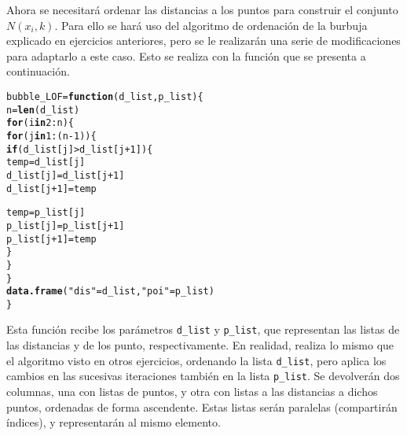 \documentclass[12pt]{report}\usepackage[]{graphicx}\usepackage[dvipsnames]{xcolor}
\makeatletter
\newcommand{\hlnum}[1]{\textcolor[rgb]{0.686,0.059,0.569}{#1}}%
\newcommand{\hlstr}[1]{\textcolor[rgb]{0.192,0.494,0.8}{#1}}%
\newcommand{\hlopt}[1]{\textcolor[rgb]{0,0,0}{#1}}%
\newcommand{\hlstd}[1]{\textcolor[rgb]{0.345,0.345,0.345}{#1}}%
\newcommand{\hlkwa}[1]{\textcolor[rgb]{0.161,0.373,0.58}{\textbf{#1}}}%
\newcommand{\hlkwb}[1]{\textcolor[rgb]{0.69,0.353,0.396}{#1}}%
\newcommand{\hlkwc}[1]{\textcolor[rgb]{0.333,0.667,0.333}{#1}}%
\newcommand{\hlkwd}[1]{\textcolor[rgb]{0.737,0.353,0.396}{\textbf{#1}}}%
\newenvironment{kframe}{%
 \def\at@end@of@kframe{}%
 \ifinner\ifhmode%
  \def\at@end@of@kframe{\end{minipage}}%
  \begin{minipage}{\columnwidth}%
 \fi\fi%
 \def\FrameCommand##1{\hskip\@totalleftmargin \hskip-\fboxsep
 \colorbox{shadecolor}{##1}\hskip-\fboxsep
     \hskip-\linewidth \hskip-\@totalleftmargin \hskip\columnwidth}%
 \MakeFramed {\advance\hsize-\width
   \@totalleftmargin\z@ \linewidth\hsize
   \@setminipage}}%
 {\par\unskip\endMakeFramed%
 \at@end@of@kframe}
\newenvironment{knitrout}{}{} %
\makeatother
\begin{document}
						Ahora se necesitará ordenar las distancias a los puntos para construir el conjunto $N(x_i, k)$. Para ello se hará uso del algoritmo de ordenación de la burbuja explicado en ejercicios anteriores, pero se le realizarán una serie de modificaciones para adaptarlo a este caso. Esto se realiza con la función que se presenta a continuación. 
						
\begin{knitrout}
\color{fgcolor}\begin{kframe}
\begin{alltt}
\hlstd{bubble_LOF} \hlkwb{=} \hlkwa{function}\hlstd{(}\hlkwc{d_list}\hlstd{,} \hlkwc{p_list}\hlstd{) \{}
        \hlstd{n} \hlkwb{=} \hlkwd{len}\hlstd{(d_list)}
        \hlkwa{for} \hlstd{(i} \hlkwa{in} \hlnum{2}\hlopt{:}\hlstd{n) \{}
                \hlkwa{for} \hlstd{(j} \hlkwa{in} \hlnum{1}\hlopt{:}\hlstd{(n}\hlopt{-}\hlnum{1}\hlstd{)) \{}
                        \hlkwa{if} \hlstd{(d_list[j]} \hlopt{>} \hlstd{d_list[j}\hlopt{+}\hlnum{1}\hlstd{]) \{}
                                \hlstd{temp} \hlkwb{=} \hlstd{d_list[j]}
                                \hlstd{d_list[j]} \hlkwb{=} \hlstd{d_list[j}\hlopt{+}\hlnum{1}\hlstd{]}
                                \hlstd{d_list[j}\hlopt{+}\hlnum{1}\hlstd{]} \hlkwb{=} \hlstd{temp}

                                \hlstd{temp} \hlkwb{=} \hlstd{p_list[j]}
                                \hlstd{p_list[j]} \hlkwb{=} \hlstd{p_list[j}\hlopt{+}\hlnum{1}\hlstd{]}
                                \hlstd{p_list[j}\hlopt{+}\hlnum{1}\hlstd{]} \hlkwb{=} \hlstd{temp}
                        \hlstd{\}}
                \hlstd{\}}
        \hlstd{\}}
        \hlkwd{data.frame}\hlstd{(}\hlstr{"dis"}\hlstd{=d_list,} \hlstr{"poi"}\hlstd{=p_list)}
\hlstd{\}}
\end{alltt}
\end{kframe}
\end{knitrout}
						
						Esta función recibe los parámetros \texttt{d\_list} y \texttt{p\_list}, que representan las listas de las distancias y de los punto, respectivamente. En realidad, realiza lo mismo que el algoritmo visto en otros ejercicios, ordenando la lista \texttt{d\_list}, pero aplica los cambios en las sucesivas iteraciones también en la lista \texttt{p\_list}. Se devolverán dos columnas, una con listas de puntos, y otra con listas a las distancias a dichos puntos, ordenadas de forma ascendente. Estas listas serán paralelas (compartirán índices), y representarán al mismo elemento. \\
						
\end{document}
